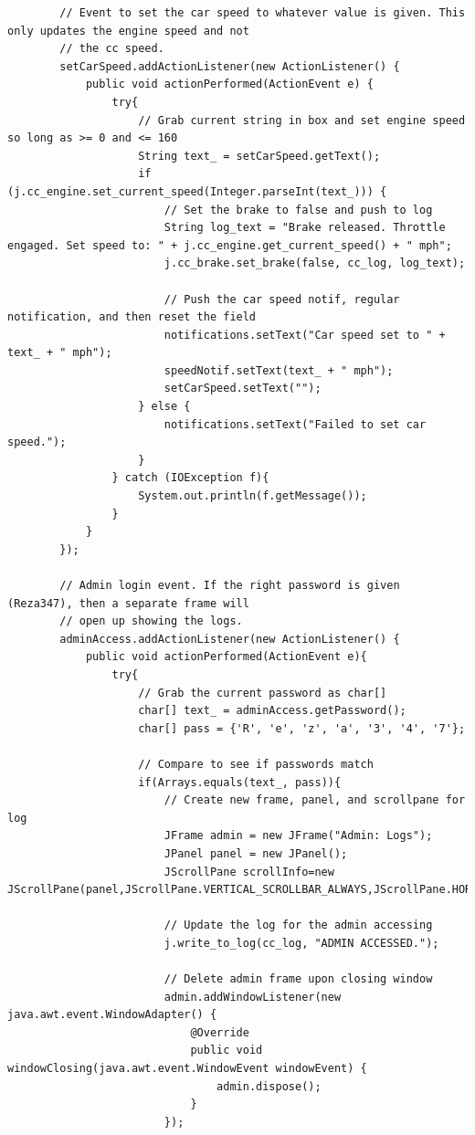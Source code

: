 \documentclass[preprint,11pt,3p]{article}
\begin{document}
\begin{lstlisting}
        // Event to set the car speed to whatever value is given. This only updates the engine speed and not
        // the cc speed.
        setCarSpeed.addActionListener(new ActionListener() {
            public void actionPerformed(ActionEvent e) {
                try{ 
                	// Grab current string in box and set engine speed so long as >= 0 and <= 160
                    String text_ = setCarSpeed.getText();
                    if (j.cc_engine.set_current_speed(Integer.parseInt(text_))) {
                    	// Set the brake to false and push to log
                    	String log_text = "Brake released. Throttle engaged. Set speed to: " + j.cc_engine.get_current_speed() + " mph";
                   		j.cc_brake.set_brake(false, cc_log, log_text);

                   		// Push the car speed notif, regular notification, and then reset the field
                    	notifications.setText("Car speed set to " + text_ + " mph");
                    	speedNotif.setText(text_ + " mph");
                    	setCarSpeed.setText("");
                    } else {
                    	notifications.setText("Failed to set car speed.");
                    }
                } catch (IOException f){ 
                    System.out.println(f.getMessage());
                }
            }
        });

        // Admin login event. If the right password is given (Reza347), then a separate frame will
        // open up showing the logs.
        adminAccess.addActionListener(new ActionListener() { 
            public void actionPerformed(ActionEvent e){ 
                try{ 
                	// Grab the current password as char[]
                    char[] text_ = adminAccess.getPassword();
                    char[] pass = {'R', 'e', 'z', 'a', '3', '4', '7'};

                    // Compare to see if passwords match
                    if(Arrays.equals(text_, pass)){ 
                    	// Create new frame, panel, and scrollpane for log
                        JFrame admin = new JFrame("Admin: Logs"); 
                        JPanel panel = new JPanel();
                        JScrollPane scrollInfo=new JScrollPane(panel,JScrollPane.VERTICAL_SCROLLBAR_ALWAYS,JScrollPane.HORIZONTAL_SCROLLBAR_ALWAYS); 

                        // Update the log for the admin accessing
                        j.write_to_log(cc_log, "ADMIN ACCESSED.");

                        // Delete admin frame upon closing window
                        admin.addWindowListener(new java.awt.event.WindowAdapter() {
                            @Override
                            public void windowClosing(java.awt.event.WindowEvent windowEvent) {
                                admin.dispose();
                            }
                        });


\end{lstlisting}
\end{document}
